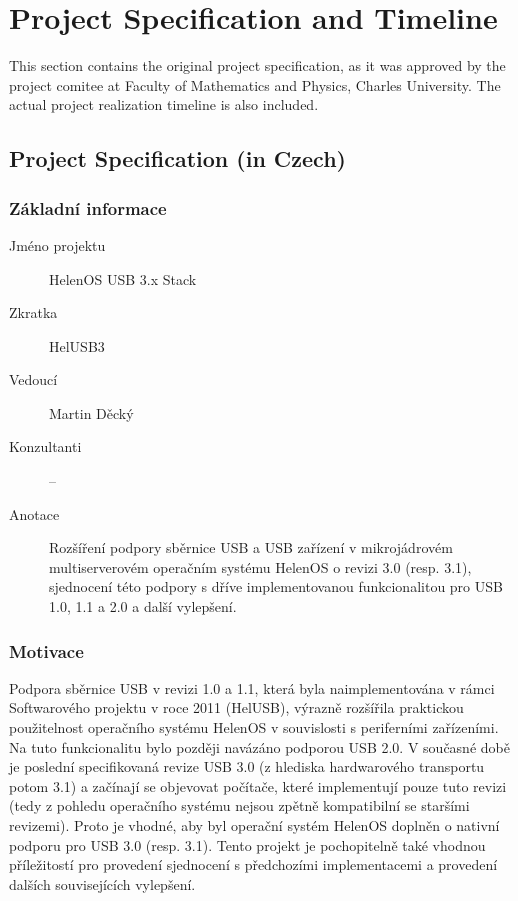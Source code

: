 \chapter{Project Specification and Timeline}

This section contains the original project specification, as it was approved by
the project comitee at Faculty of Mathematics and Physics, Charles University.
The actual project realization timeline is also included.


\section{Project Specification (in Czech)}

\subsection{Základní informace}

\begin{description}
	\item[Jméno projektu] HelenOS USB 3.x Stack
	\item[Zkratka] HelUSB3
	\item[Vedoucí] Martin Děcký 
	\item[Konzultanti] --
	\item[Anotace]
		Rozšíření podpory sběrnice USB a USB zařízení v mikrojádrovém multiserverovém operačním systému HelenOS o revizi 3.0 (resp. 3.1), sjednocení této podpory s dříve implementovanou funkcionalitou pro USB 1.0, 1.1 a 2.0 a další vylepšení.
\end{description}

\subsection{Motivace}

Podpora sběrnice USB v revizi 1.0 a 1.1, která byla naimplementována v rámci Softwarového
projektu v roce 2011 (HelUSB), výrazně rozšířila praktickou použitelnost operačního systému
HelenOS v souvislosti s periferními zařízeními. Na tuto funkcionalitu bylo později navázáno
podporou USB 2.0. V současné době je poslední specifikovaná revize USB 3.0 (z hlediska
hardwarového transportu potom 3.1) a začínají se objevovat počítače, které implementují pouze tuto
revizi (tedy z pohledu operačního systému nejsou zpětně kompatibilní se staršími revizemi). Proto
je vhodné, aby byl operační systém HelenOS doplněn o nativní podporu pro USB 3.0 (resp. 3.1).
Tento projekt je pochopitelně také vhodnou příležitostí pro provedení sjednocení s předchozími
implementacemi a provedení dalších souvisejících vylepšení.

